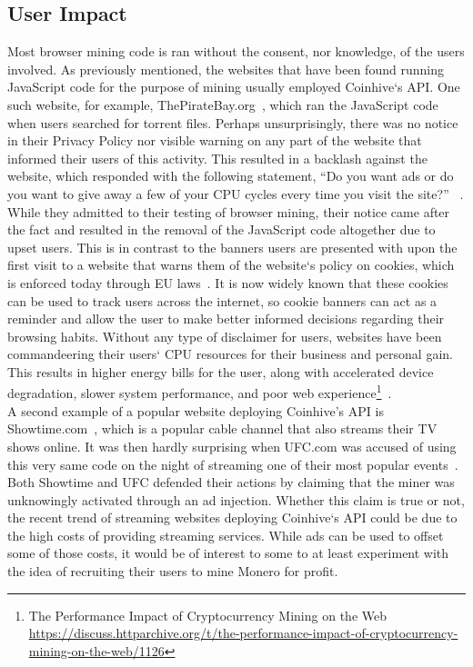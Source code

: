 \subsection{\textbf{User Impact}}
Most browser mining code is ran without the consent, nor knowledge, of the users involved. As previously mentioned, the websites that have been found running JavaScript code for the purpose of mining usually employed Coinhive`s API. One such website, for example, ThePirateBay.org~\cite{bbcmintcrypto}, which ran the JavaScript code when users searched for torrent files. Perhaps unsurprisingly, there was no notice in their Privacy Policy nor visible warning on any part of the website that informed their users of this activity. This resulted in a backlash against the website, which responded with the following statement, ``Do you want ads or do you want to give away a few of your CPU cycles every time you visit the site?'' ~\cite{piratesbayblog}. While they admitted to their testing of browser mining, their notice came after the fact and resulted in the removal of the JavaScript code altogether due to upset users. This is in contrast to the banners users are presented with upon the first visit to a website that warns them of the website`s policy on cookies, which is enforced today through EU laws~\cite{eucookie}. It is now widely known that these cookies can be used to track users across the internet, so cookie banners can act as a reminder and allow the user to make better informed decisions regarding their browsing habits. Without any type of disclaimer for users, websites have been commandeering their users` CPU resources for their business and personal gain. This results in higher energy bills for the user, along with accelerated device degradation, slower system performance, and poor web experience\footnote{The Performance Impact of Cryptocurrency Mining on the Web \url{https://discuss.httparchive.org/t/the-performance-impact-of-cryptocurrency-mining-on-the-web/1126}}~\cite{gaurdianelectricity}.
\\
A second example of a popular website deploying Coinhive’s API is Showtime.com~\cite{gaurdianelectricity}, which is a popular cable channel that also streams their TV shows online. It was then hardly surprising when UFC.com was accused of using this very same code on the night of streaming one of their most popular events~\cite{registerufcmonero}. Both Showtime and UFC defended their actions by claiming that the miner was unknowingly activated through an ad injection. Whether this claim is true or not, the recent trend of streaming websites deploying Coinhive`s API could be due to the high costs of providing streaming services. While ads can be used to offset some of those costs, it would be of interest to some to at least experiment with the idea of recruiting their users to mine Monero for profit.
